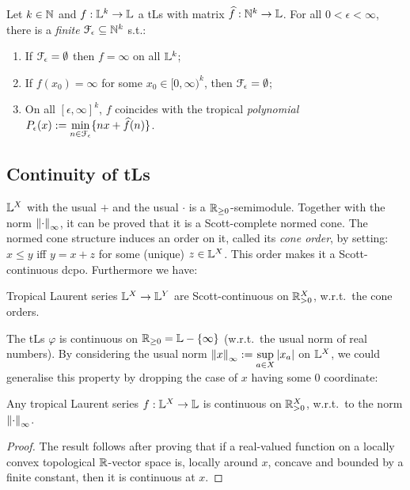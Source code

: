 \begin{theorem}\label{theorem:fepsilon}
 Let $k\in\mathbb{N}$ and $f:\mathbb{L}^k\to\mathbb{L}$ a tLs with matrix $\widehat f:\mathbb{N}^k\to\mathbb{L}$.
 For all $0<\epsilon<\infty$, there is a \emph{finite} $\mathcal{F}_\epsilon \subseteq \mathbb{N}^k$ s.t.:
 \begin{enumerate}
  \item If $\mathcal{F}_\epsilon=\emptyset$ then $f=\infty$ on all $\mathbb{L}^k$;
  \item If $f(x_0)=\infty$ for some $x_0\in[0,\infty)^k$, then $\mathcal{F}_\epsilon=\emptyset$;
  \item On all $[\epsilon,\infty]^k$, $f$ coincides with the tropical \emph{polynomial} $P_\epsilon(x):=\min\limits_{n\in \mathcal{F}_\epsilon}\{nx+\widehat f(n)\}$.
 \end{enumerate}
\end{theorem}




\subsection{Continuity of tLs}%

$\mathbb{L}^X$ with the usual $+$ and the usual $\cdot$ is a $\mathbb{R}_{\geq0}$-semimodule.
Together with the norm $\left\lVert\cdot\right\rVert_\infty$, it can be proved that it is a Scott-complete normed cone.
The normed cone structure induces an order on it, called its \emph{cone order}, by setting:
$x\leq y$ iff $y=x+z$ for some (unique) $z\in\mathbb{L}^X$.
This order makes it a Scott-continuous dcpo.
Furthermore we have:

\begin{proposition}
  Tropical Laurent series $\mathbb{L}^X\to\mathbb{L}^Y$ are Scott-continuous on $\mathbb{R}_{>0}^X$, w.r.t.\ the cone orders.
\end{proposition}
The tLs $\varphi$ is continuous on $\mathbb{R}_{\geq0}=\mathbb{L}-\{\infty\}$ (w.r.t.\ the usual norm of real numbers).
By considering the usual norm $\left\lVert x\right\rVert_\infty:=\sup\limits_{a\in X} \left\lvert x_a\right\rvert$ on $\mathbb{L}^X$, we could generalise this property by dropping the case of $x$ having some $0$ coordinate:

\begin{theorem}\label{thm:cont}
 Any tropical Laurent series $f:\mathbb{L}^X\to\mathbb{L}$ is continuous on $\mathbb{R}_{>0}^X$, w.r.t.\ to the norm $\left\lVert\cdot\right\rVert_\infty$.
\end{theorem}
\begin{proof}
 The result follows after proving that if a real-valued function on a locally convex topological $\mathbb{R}$-vector space is, locally around $x$, concave and bounded by a finite constant, then it is continuous at $x$.
\end{proof}


